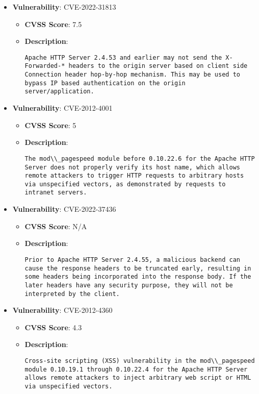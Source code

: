 \documentclass{article}
\begin{document}
\begin{itemize}
        \item \textbf{Vulnerability}: CVE-2022-31813
        \begin{itemize}
            \item \textbf{CVSS Score}:  7.5 
            \item \textbf{Description}:
            \parbox[t]{0.9\linewidth}{
                \verb|Apache HTTP Server 2.4.53 and earlier may not send the X-Forwarded-* headers to the origin server based on client side Connection header hop-by-hop mechanism. This may be used to bypass IP based authentication on the origin server/application.|
            }
        \end{itemize}
    
        \item \textbf{Vulnerability}: CVE-2012-4001
        \begin{itemize}
            \item \textbf{CVSS Score}:  5 
            \item \textbf{Description}:
            \parbox[t]{0.9\linewidth}{
                \verb|The mod\\_pagespeed module before 0.10.22.6 for the Apache HTTP Server does not properly verify its host name, which allows remote attackers to trigger HTTP requests to arbitrary hosts via unspecified vectors, as demonstrated by requests to intranet servers.|
            }
        \end{itemize}
    
        \item \textbf{Vulnerability}: CVE-2022-37436
        \begin{itemize}
            \item \textbf{CVSS Score}:  N/A 
            \item \textbf{Description}:
            \parbox[t]{0.9\linewidth}{
                \verb|Prior to Apache HTTP Server 2.4.55, a malicious backend can cause the response headers to be truncated early, resulting in some headers being incorporated into the response body. If the later headers have any security purpose, they will not be interpreted by the client.|
            }
        \end{itemize}
    
        \item \textbf{Vulnerability}: CVE-2012-4360
        \begin{itemize}
            \item \textbf{CVSS Score}:  4.3 
            \item \textbf{Description}:
            \parbox[t]{0.9\linewidth}{
                \verb|Cross-site scripting (XSS) vulnerability in the mod\\_pagespeed module 0.10.19.1 through 0.10.22.4 for the Apache HTTP Server allows remote attackers to inject arbitrary web script or HTML via unspecified vectors.|
            }
        \end{itemize}
    

\end{itemize}
\end{document}
